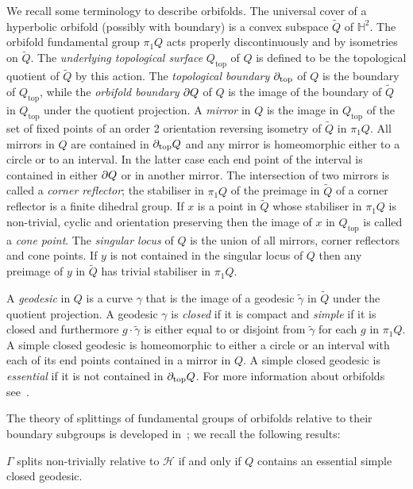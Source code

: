 We recall some terminology to describe orbifolds. The universal cover of a
hyperbolic orbifold (possibly with boundary) is a convex subspace $\tilde{Q}$
of $\mathbb{H}^2$. The orbifold fundamental group $\pi_1Q$ acts properly
discontinuously and by isometries on $\tilde{Q}$. The \emph{underlying
topological surface} $Q_\text{top}$ of $Q$ is defined to be the topological
quotient of $\tilde{Q}$ by this action. The \emph{topological boundary}
$\partial_\text{top}$ of $Q$ is the boundary of $Q_\text{top}$, while the
\emph{orbifold boundary} $\partial Q$ of $Q$ is the image of the boundary of
$\tilde{Q}$ in $Q_\text{top}$ under the quotient projection. A \emph{mirror} in
$Q$ is the image in $Q_\text{top}$ of the set of fixed points of an order 2
orientation reversing isometry of $\tilde{Q}$ in $\pi_1Q$. All mirrors in $Q$
are contained in $\partial_\text{top}Q$ and any mirror is homeomorphic either
to a circle or to an interval. In the latter case each end point of the
interval is contained in either $\partial Q$ or in another mirror. The
intersection of two mirrors is called a \emph{corner reflector}; the stabiliser
in $\pi_1Q$ of the preimage in $\tilde{Q}$ of a corner reflector is a finite
dihedral group. If $x$ is a point in $\tilde{Q}$ whose stabiliser in $\pi_1Q$
is non-trivial, cyclic and orientation preserving then the image of $x$ in
$Q_\text{top}$ is called a \emph{cone point}. The \emph{singular locus} of $Q$
is the union of all mirrors, corner reflectors and cone points. If $y$ is not
contained in the singular locus of $Q$ then any preimage of $y$ in $\tilde{Q}$
has trivial stabiliser in $\pi_1Q$.

A \emph{geodesic} in $Q$ is a curve $\gamma$ that is the image of a geodesic
$\tilde\gamma$ in $\tilde{Q}$ under the quotient projection. A geodesic
$\gamma$ is \emph{closed} if it is compact and \emph{simple} if it is closed
and furthermore $g\cdot\tilde\gamma$ is either equal to or disjoint from
$\tilde\gamma$ for each $g$ in $\pi_1Q$. A simple closed geodesic is
homeomorphic to either a circle or an interval with each of its end points
contained in a mirror in $Q$. A simple closed geodesic is \emph{essential} if
it is not contained in $\partial_\text{top}Q$. For more information about
orbifolds see~\cite{scott83}.

The theory of splittings of fundamental groups of orbifolds relative to their
boundary subgroups is developed in~\cite{guirardellevitt16}; we recall the
following results:

\begin{lem}\cite[Corollary 5.6]{guirardellevitt16}\label{lem:splitiffnonsmall}
$\Gamma$ splits non-trivially relative to $\mathcal{H}$ if and only if $Q$
contains an essential simple closed geodesic.\end{lem}

